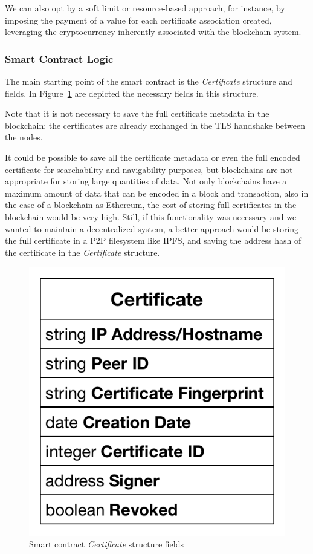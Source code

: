 We can also opt by a soft limit or resource-based approach, for instance, by imposing the payment of a value for each certificate association created, leveraging the cryptocurrency inherently associated with the blockchain system.

\subsubsection{Smart Contract Logic}
\label{subsection:smart-contract-logic}

The main starting point of the smart contract is the \textit{Certificate} structure and fields.
In Figure~\ref{fig:certificate-structure} are depicted the necessary fields in this structure.

Note that it is not necessary to save the full certificate metadata in the blockchain: the certificates are already exchanged in the TLS handshake between the nodes.

It could be possible to save all the certificate metadata or even the full encoded certificate for searchability and navigability purposes, but blockchains are not appropriate for storing large quantities of data.
Not only blockchains have a maximum amount of data that can be encoded in a block and transaction, also in the case of a blockchain as Ethereum, the cost of storing full certificates in the blockchain would be very high.
Still, if this functionality was necessary and we wanted to maintain a decentralized system, a better approach would be storing the full certificate in a \ac{P2P} filesystem like \ac{IPFS}, and saving the address hash of the certificate in the \textit{Certificate} structure.

\begin{figure}[htb]
  \centering
  \includegraphics[scale=0.5]{Figures/certificate-structure.pdf}
  \caption{Smart contract \textit{Certificate} structure fields}
\label{fig:certificate-structure}
\end{figure}

